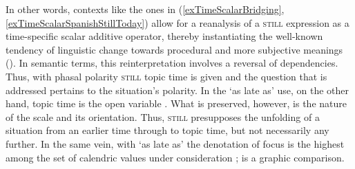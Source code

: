 In other words, contexts like the ones in (\ref{exTimeScalarBridging}, \ref{exTimeScalarSpanishStillToday}) allow for a reanalysis of a \textsc{still} expression as a time-specific scalar additive operator, thereby instantiating the well-known tendency of linguistic change towards procedural and more subjective meanings (). In semantic terms, this reinterpretation involves a reversal of dependencies. Thus, with phasal polarity \textsc{still} topic time is given and the question that is addressed pertains to the situation's polarity. In the \lq as late as\rq{ }use, on the other hand, topic time is the open variable \parencite{Krifka2000}. What is preserved, however, is the nature of the scale and its orientation. Thus, \textsc{still} presupposes the unfolding of a situation from an earlier time through to topic time, but not necessarily any further. In the same vein, with \lq as late as' the denotation of focus is the highest among the set of calendric values under consideration \parencite[161]{MosegaardHansen2008};  is a graphic comparison.

